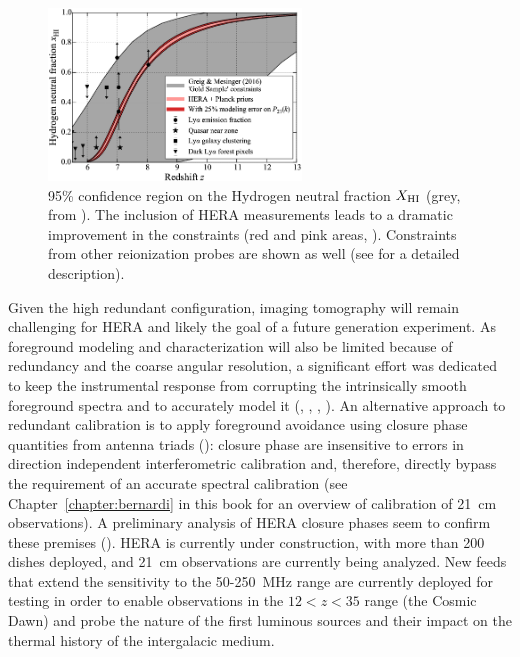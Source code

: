\begin{figure}[]
\begin{center}
\includegraphics[width=0.6\textwidth]{Koopmans_Bernardi/hera_ion_hist}
\end{center}
\caption{95\% confidence region on the Hydrogen neutral fraction $X_{\rm HI}$ (grey, from \cite{greig17}). The inclusion of HERA measurements leads to a dramatic improvement in the constraints (red and pink areas, \cite{liu16b}). Constraints from other reionization probes are shown as well (see \cite{deboer17} for a detailed description).}
\label{fig:fig_hera_ion_hist}
\end{figure}
%
Given the high redundant configuration, imaging tomography will remain challenging for HERA and likely the goal of a future generation experiment. As foreground modeling and characterization will also be limited because of redundancy and the coarse angular resolution, a significant effort was dedicated to keep the instrumental response from corrupting the intrinsically smooth foreground spectra and to accurately model it (\cite{neben16}, \cite{ewallwice16}, \cite{thyagarajan16}, \cite{patra18}). An alternative approach to redundant calibration is to apply foreground avoidance using closure phase quantities from antenna triads (\cite{thyagarajan18}): closure phase are insensitive to errors in direction independent interferometric calibration and, therefore, directly bypass the requirement of an accurate spectral calibration (see Chapter~\ref{chapter:bernardi} in this book for an overview of calibration of 21~cm observations). A preliminary analysis of HERA closure phases seem to confirm these premises (\cite{carilli18}).
%
HERA is currently under construction, with more than 200 dishes deployed, and 21~cm observations are currently being analyzed. New feeds that extend the sensitivity to the 50-250~MHz range are currently deployed for testing in order to enable observations in the $12 < z < 35$ range (the Cosmic Dawn) and probe the nature of the first luminous sources and their impact on the thermal history of the intergalacic medium.



